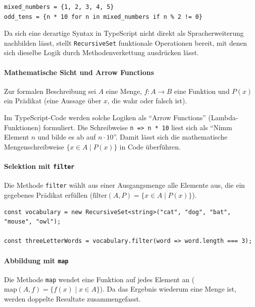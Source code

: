 \begin{listing}[ht]
    \caption{Python: Mengenkomprehension mit Selektion und Transformation}
    \label{lst:rs_comprehension_python}
    \begin{verbatim}
mixed_numbers = {1, 2, 3, 4, 5}
odd_tens = {n * 10 for n in mixed_numbers if n % 2 != 0}
    \end{verbatim}
\end{listing}

Da sich eine derartige Syntax in TypeScript nicht direkt als Spracherweiterung nachbilden lässt, stellt \texttt{RecursiveSet} funktionale Operationen bereit, mit denen sich dieselbe Logik durch Methodenverkettung ausdrücken lässt.

\paragraph*{Mathematische Sicht und Arrow Functions}
Zur formalen Beschreibung sei \(A\) eine Menge, \(f \colon A \to B\) eine Funktion und \(P(x)\) ein Prädikat (eine Aussage über \(x\), die wahr oder falsch ist).

Im TypeScript-Code werden solche Logiken als \enquote{Arrow Functions} (Lambda-Funktionen) formuliert. Die Schreibweise \texttt{n => n * 10} liest sich als \enquote{Nimm Element \(n\) und bilde es ab auf \(n \cdot 10\)}. Damit lässt sich die mathematische Mengenschreibweise \(\{x \in A \mid P(x)\}\) in Code überführen.

\paragraph{Selektion mit \texttt{filter}}
Die Methode \texttt{filter} wählt aus einer Ausgangsmenge alle Elemente aus, die ein gegebenes Prädikat erfüllen (\(\mathrm{filter}(A, P) = \{x \in A \mid P(x)\}\)).

\begin{listing}[ht]
    \caption{Selektion mit \texttt{filter}}
    \label{lst:rs_filter_ts}
    \begin{verbatim}
const vocabulary = new RecursiveSet<string>("cat", "dog", "bat", "mouse", "owl");

const threeLetterWords = vocabulary.filter(word => word.length === 3);
    \end{verbatim}
\end{listing}

\paragraph{Abbildung mit \texttt{map}}
Die Methode \texttt{map} wendet eine Funktion auf jedes Element an (\(\mathrm{map}(A, f) = \{f(x) \mid x \in A\}\)). Da das Ergebnis wiederum eine Menge ist, werden doppelte Resultate zusammengefasst.

